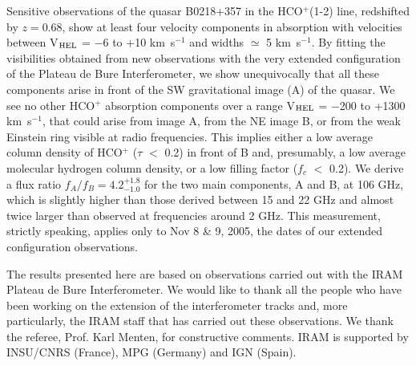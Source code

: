 \documentclass[oldversion]{aa}
\begin{document}
Sensitive observations of the quasar B0218+357 in the HCO$^+$(1-2) line, redshifted by $z = 0.68$,
show at least four velocity components in absorption with velocities between V$_{\rm HEL}$ = $-$6
to +10 km~s$^{-1}$ and widths $\simeq$ 5 km~s$^{-1}$. By fitting the visibilities
obtained from new observations with the very extended configuration of the Plateau de Bure
Interferometer, we show unequivocally that all these components arise in front of the SW
gravitational image (A) of the quasar. We see no other HCO$^+$ absorption components over
a range V$_{\rm HEL}$ = $-$200 to +1300 km~s$^{-1}$, that could arise from image A,
from the NE image B, or from the weak Einstein ring visible at radio frequencies. This
implies either a low average column density of HCO$^+$ ($\tau$ $<$ 0.2) in front of B and,
presumably, a low average molecular hydrogen column density, or a low filling factor
($f_c$ $<$ 0.2). We derive a flux ratio
$f_A/f_B = 4.2 _{-1.0} ^{+1.8}$ for the two main components, A and B, at 106 GHz, which is slightly
higher than those derived between 15 and 22 GHz and almost twice larger than observed at frequencies around 2
GHz. This measurement, strictly speaking, applies only to Nov 8 \& 9, 2005, the dates of
our extended configuration observations.


\begin{acknowledgements}
The results presented here are based on observations carried out with the IRAM Plateau de
Bure Interferometer. We would like to thank all the people who have been working on the
extension of the interferometer tracks and, more particularly, the IRAM staff that has
carried out these observations. 
We thank the referee, Prof. Karl Menten, for constructive comments.
IRAM is supported by INSU/CNRS (France), MPG (Germany) and
IGN (Spain).
\end{acknowledgements}
\end{document}
